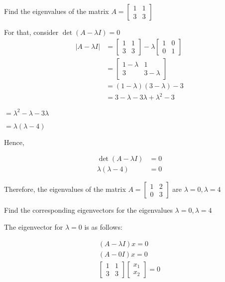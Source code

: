 \documentclass{article}
\begin{document}
Find the eigenvalues of the matrix $A=\left[\begin{array}{ll}1 & 1 \\ 3 & 3\end{array}\right]$

For that, consider $\operatorname{det}(A-\lambda I)=0$
$$
\begin{aligned}
|A-\lambda I| & =\left[\begin{array}{ll}
1 & 1 \\
3 & 3
\end{array}\right]-\lambda\left[\begin{array}{ll}
1 & 0 \\
0 & 1
\end{array}\right] \\
& =\left[\begin{array}{cc}
1-\lambda & 1 \\
3 & 3-\lambda
\end{array}\right] \\
& =(1-\lambda)(3-\lambda)-3 \\
& =3-\lambda-3 \lambda+\lambda^{2}-3
\end{aligned}
$$

$=\lambda^{2}-\lambda-3 \lambda$

$=\lambda(\lambda-4)$

Hence,

$$
\begin{aligned}
\operatorname{det}(A-\lambda I) & =0 \\
\lambda(\lambda-4) & =0
\end{aligned}
$$

Therefore, the eigenvalues of the matrix $A=\left[\begin{array}{ll}1 & 2 \\ 0 & 3\end{array}\right]$ are $\lambda=0, \lambda=4$

Find the corresponding eigenvectors for the eigenvalues $\lambda=0, \lambda=4$

The eigenvector for $\lambda=0$ is as follows:

$$
\begin{array}{r}
(A-\lambda I) x=0 \\
(A-0 I) x=0 \\
{\left[\begin{array}{ll}
1 & 1 \\
3 & 3
\end{array}\right]\left[\begin{array}{l}
x_{1} \\
x_{2}
\end{array}\right]=0}
\end{array}
$$
\end{document}
